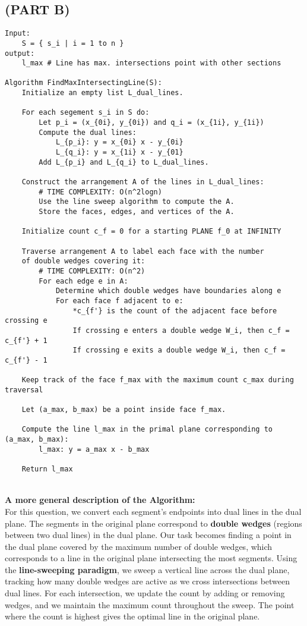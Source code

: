 \documentclass{article}
\begin{document}
\newpage

\subsection*{(PART B)}
\begin{verbatim}
Input:
    S = { s_i | i = 1 to n }
output:
    l_max # Line has max. intersections point with other sections

Algorithm FindMaxIntersectingLine(S): 
    Initialize an empty list L_dual_lines.

    For each segement s_i in S do:
        Let p_i = (x_{0i}, y_{0i}) and q_i = (x_{1i}, y_{1i})
        Compute the dual lines:
            L_{p_i}: y = x_{0i} x - y_{0i}
            L_{q_i}: y = x_{1i} x - y_{01}
        Add L_{p_i} and L_{q_i} to L_dual_lines.

    Construct the arrangement A of the lines in L_dual_lines:
        # TIME COMPLEXITY: O(n^2logn)
        Use the line sweep algorithm to compute the A.
        Store the faces, edges, and vertices of the A.

    Initialize count c_f = 0 for a starting PLANE f_0 at INFINITY

    Traverse arrangement A to label each face with the number 
    of double wedges covering it: 
        # TIME COMPLEXITY: O(n^2)
        For each edge e in A:
            Determine which double wedges have boundaries along e
            For each face f adjacent to e:
                *c_{f'} is the count of the adjacent face before crossing e
                If crossing e enters a double wedge W_i, then c_f = c_{f'} + 1
                If crossing e exits a double wedge W_i, then c_f = c_{f'} - 1
    
    Keep track of the face f_max with the maximum count c_max during traversal
    
    Let (a_max, b_max) be a point inside face f_max.

    Compute the line l_max in the primal plane corresponding to (a_max, b_max):
        l_max: y = a_max x - b_max

    Return l_max
\end{verbatim}
\\
\textbf{A more general description of the Algorithm: }
\\
For this question, we convert each segment's endpoints into dual lines in the dual plane. The segments in the original plane correspond to \textbf{double wedges} (regions between two dual lines) in the dual plane. Our task becomes finding a point in the dual plane covered by the maximum number of double wedges, which corresponds to a line in the original plane intersecting the most segments. Using the \textbf{line-sweeping paradigm}, we sweep a vertical line across the dual plane, tracking how many double wedges are active as we cross intersections between dual lines. For each intersection, we update the count by adding or removing wedges, and we maintain the maximum count throughout the sweep. The point where the count is highest gives the optimal line in the original plane.
\end{document}
